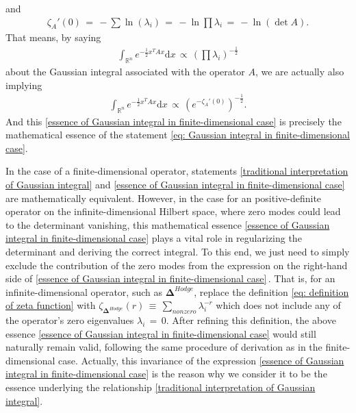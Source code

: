 and
\begin{equation}
    \begin{split}
        \zeta_{A}'\left(0\right)\,=\,-\sum\ln\left(\lambda_{i}\right)\,=\,-\ln\prod\lambda_{i}\,=\,-\ln\left(\det A\right).
    \end{split}
\end{equation}
That means, by saying
\begin{equation}\label{traditional interpretation of Gaussian integral}
    \begin{split}
        \int_{\mathbb{R}^n}e^{-\frac{1}{2}x^{T}Ax}\mathrm{d}x\,\propto\,\left(\prod\lambda_{i}\right)^{-\frac{1}{2}}
    \end{split}
\end{equation}
about the Gaussian integral associated with the operator $A$, we are actually also implying
\begin{equation}\label{essence of Gaussian integral in finite-dimensional case}
    \begin{split}
        \int_{\mathbb{R}^{n}}e^{-\frac{1}{2}x^{T}Ax}\mathrm{d}x\,\propto\,\left(e^{-\zeta_{A}'\left(0\right)}\right)^{-\frac{1}{2}}.
    \end{split}
\end{equation}
And this \eqref{essence of Gaussian integral in finite-dimensional case} is precisely the mathematical essence of the statement \eqref{eq: Gaussian integral in finite-dimensional case}. 
\par In the case of a finite-dimensional operator, statements \eqref{traditional interpretation of Gaussian integral} and \eqref{essence of Gaussian integral in finite-dimensional case} are mathematically equivalent. However, in the case for an positive-definite operator on the infinite-dimensional Hilbert space, where zero modes could lead to the determinant vanishing, this mathematical essence \eqref{essence of Gaussian integral in finite-dimensional case} plays a vital role in regularizing the determinant and deriving the correct integral. To this end, we just need to simply exclude the contribution of the zero modes from the expression on the right-hand side of \eqref{essence of Gaussian integral in finite-dimensional case}\,\cite{raySinger71rtorsion}. That is, for an infinite-dimensional operator, such as $\mathbf{\Delta}^{Hodge}$, replace the definition \eqref{eq: definition of zeta function} with $\zeta_{\mathbf{\Delta}^{Hodge}}\left(r\right)\,\equiv\,\sum_{nonzero}\lambda_{i}^{-r}$ which does not include any of the operator's zero eigenvalues $\lambda_{i}\,=\,0$. After refining this definition, the above essence \eqref{essence of Gaussian integral in finite-dimensional case} would still naturally remain valid, following the same procedure of derivation as in the finite-dimensional case. Actually, this invariance of the expression \eqref{essence of Gaussian integral in finite-dimensional case} is the reason why  we consider it to be the essence underlying the relationship \eqref{traditional interpretation of Gaussian integral}. 
